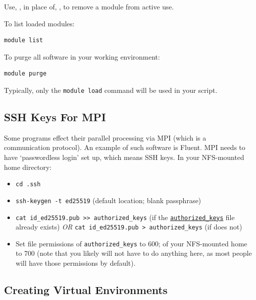 \documentclass{easychair}
\begin{document}
Use, , in place of, , to remove a module from active use.

To list loaded modules:

\begin{verbatim}
module list
\end{verbatim}

To purge all software in your working environment:

\begin{verbatim}
module purge
\end{verbatim}

Typically, only the \texttt{module load} command will be used in your script.



\subsection{SSH Keys For MPI}
\label{sect:ssh-mpi}

Some programs effect their parallel processing via MPI (which is a 
communication protocol). An example of such software is Fluent. MPI needs to 
have `passwordless login' set up, which means SSH keys. In your NFS-mounted 
home directory:

\begin{itemize}
\item
\texttt{cd .ssh}
\item
\texttt{ssh-keygen -t ed25519} (default location; blank passphrase) 
\item
\texttt{cat id\_ed25519.pub >> authorized\_keys} (if the \texttt{\href{https://www.ssh.com/academy/ssh/authorized-keys-file}{authorized\_keys}}
file already exists) \emph{OR} \texttt{cat id\_ed25519.pub > authorized\_keys} (if does not) 
\item
Set file permissions of \texttt{authorized\_keys} to 600; of your NFS-mounted home
to 700 (note that you likely will not have to do anything here, as most people
will have those permissions by default). 
\end{itemize}

\subsection{Creating Virtual Environments}
\label{sect:environments}
\label{sect:examples-venv}
\end{document}

